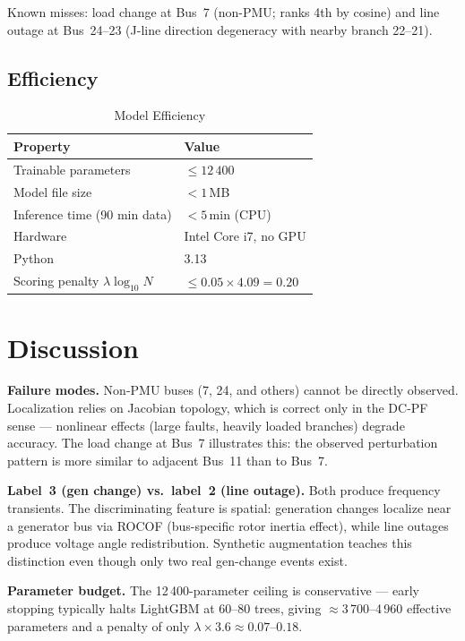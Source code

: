 \documentclass[conference]{IEEEtran}
\begin{document}
Known misses: load change at Bus~7 (non-PMU; ranks 4th by cosine) and line
outage at Bus~24--23 (J-line direction degeneracy with nearby branch 22--21).

\subsection{Efficiency}

\begin{table}[h]
\caption{Model Efficiency}
\label{tab:efficiency}
\begin{center}
\begin{tabular}{ll}
\toprule
Property & Value \\
\midrule
Trainable parameters & $\leq 12\,400$ \\
Model file size & $<1$\,MB \\
Inference time (90 min data) & $<5$\,min (CPU) \\
Hardware & Intel Core i7, no GPU \\
Python & 3.13 \\
Scoring penalty $\lambda\log_{10}N$ & $\leq 0.05 \times 4.09 = 0.20$ \\
\bottomrule
\end{tabular}
\end{center}
\end{table}

\section{Discussion}

\textbf{Failure modes.}
Non-PMU buses (7, 24, and others) cannot be directly observed.
Localization relies on Jacobian topology, which is correct only in the DC-PF
sense — nonlinear effects (large faults, heavily loaded branches) degrade accuracy.
The load change at Bus~7 illustrates this: the observed perturbation pattern is
more similar to adjacent Bus~11 than to Bus~7.

\textbf{Label~3 (gen change) vs.\ label~2 (line outage).}
Both produce frequency transients.  The discriminating feature is spatial:
generation changes localize near a generator bus via ROCOF (bus-specific rotor
inertia effect), while line outages produce voltage angle redistribution.
Synthetic augmentation teaches this distinction even though only two real
gen-change events exist.

\textbf{Parameter budget.}
The 12\,400-parameter ceiling is conservative — early stopping typically
halts LightGBM at 60--80 trees, giving $\approx$3\,700--4\,960 effective
parameters and a penalty of only $\lambda \times 3.6 \approx 0.07$--$0.18$.
\end{document}
